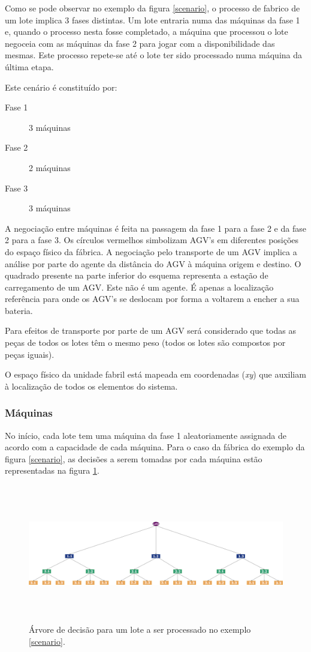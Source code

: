 \begin{titlepage}
Como se pode observar no exemplo da figura \ref{scenario}, o processo de fabrico de um lote implica 3 fases distintas. Um lote entraria numa das máquinas da fase 1 e, quando o processo nesta fosse completado, a máquina que processou o lote negoceia com as máquinas da fase 2 para jogar com a disponibilidade das mesmas. Este processo repete-se até o lote ter sido processado numa máquina da última etapa. 

\newpage
Este cenário é constituído por:

\begin{description}
\item[Fase 1] 3 máquinas
\item[Fase 2] 2 máquinas 
\item[Fase 3] 3 máquinas
\end{description}

A negociação entre máquinas é feita na passagem da fase 1 para a fase 2 e da fase 2 para a fase 3. Os círculos vermelhos simbolizam AGV's em diferentes posições do espaço físico da fábrica. A negociação pelo transporte de um AGV implica a análise por parte do agente da distância do AGV à máquina origem e destino. O quadrado presente na parte inferior do esquema representa a estação de carregamento de um AGV. Este não é um agente. É apenas a localização referência para onde os AGV's se deslocam por forma a voltarem a encher a sua bateria.

Para efeitos de transporte por parte de um AGV será considerado que todas as peças de todos os lotes têm o mesmo peso (todos os lotes são compostos por peças iguais).

O espaço físico da unidade fabril está mapeada em coordenadas (\textit{xy}) que auxiliam à localização de todos os elementos do sistema.

\subsubsection{Máquinas}

No início, cada lote tem uma máquina da fase 1 aleatoriamente assignada de acordo com a capacidade de cada máquina. Para o caso da fábrica do exemplo da figura \ref{scenario}, as decisões a serem tomadas por cada máquina estão representadas na figura \ref{decisionMach}.

\begin{figure}[H]
  \raggedleft 
    \includegraphics[width=19cm, height = 6cm]{DecisionTreeMachines.png}
  \caption{Árvore de decisão para um lote a ser processado no exemplo \ref{scenario}.}
  \label{decisionMach}
\end{figure}


\end{titlepage}
